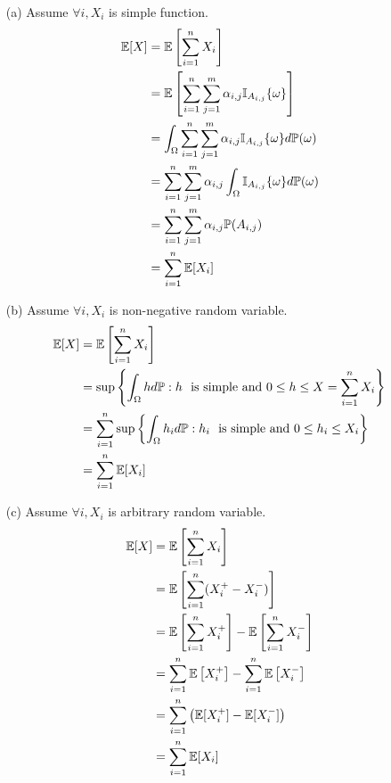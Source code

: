 \begin{enumerate}
\item[(a)] Assume $\forall i, X_i$ is simple function.
    \begin{align}
        \mathbb{E}[X]&=\mathbb{E}\left[{\sum^{n}_{i=1} X_i}\right] \notag \\
        &=\mathbb{E}\left[\sum^{n}_{i=1}\sum^{m}_{j=1}\alpha_{i,j}\mathbb{I}_{A_{i,j}}\{\omega \}\right]\notag \\
        &=\int_{\Omega}\sum^{n}_{i=1}\sum^{m}_{j=1}\alpha_{i,j}\mathbb{I}_{A_{i,j}}\{\omega\} d\mathbb{P}(\omega)\notag \\
        &=\sum^{n}_{i=1}\sum^{m}_{j=1}\alpha_{i,j}\int_{\Omega}\mathbb{I}_{A_{i,j}}\{\omega\} d\mathbb{P}(\omega)\notag \\
        &=\sum^{n}_{i=1}\sum^{m}_{j=1}\alpha_{i,j}\mathbb{P}(A_{i,j})\notag \\
        &=\sum^{n}_{i=1}\mathbb{E}[X_i]\notag
    \end{align}
\item[(b)] Assume $\forall i, X_i$ is non-negative random variable.
    \begin{align}
        \mathbb{E}[X]&=\mathbb{E}\left[\sum^{n}_{i=1}X_i\right]\notag \\
        &=\sup\left\{\int_{\Omega}hd\mathbb{P}:{h \ \text{ is simple and} }\ 0\leq h\leq X=\sum^{n}_{i=1}X_i \right\}\notag \\
        &=\sum^{n}_{i=1}\sup\left\{\int_{\Omega}h_id\mathbb{P}:{h_i \ \text{ is simple and} }\ 0\leq h_i\leq X_i \right\}\notag \\
        &=\sum^{n}_{i=1}\mathbb{E}[X_i]\notag
    \end{align}
\item[(c)] Assume $\forall i, X_i$ is arbitrary random variable.
    \begin{align}
        \mathbb{E}[X]&=\mathbb{E}\left[\sum^{n}_{i=1}X_i\right]\notag\\
        &=\mathbb{E}\left[\sum^{n}_{i=1}(X^+_i-X^-_i)\right]\notag\\
        &=\mathbb{E}\left[\sum^n_{i=1}X^+_i\right]-\mathbb{E}\left[\sum^n_{i=1}X^-_i\right]\notag\\
        &=\sum^n_{i=1}\mathbb{E}\left[X^+_i\right]-\sum^n_{i=1}\mathbb{E}\left[X^-_i\right]\notag\\
        &=\sum^n_{i=1}\left(\mathbb{E}[X^+_i]-\mathbb{E}[X^-_i] \right)\notag\\
        &=\sum^n_{i=1}\mathbb{E}[X_i]\notag
    \end{align}
\end{enumerate}
\fi

